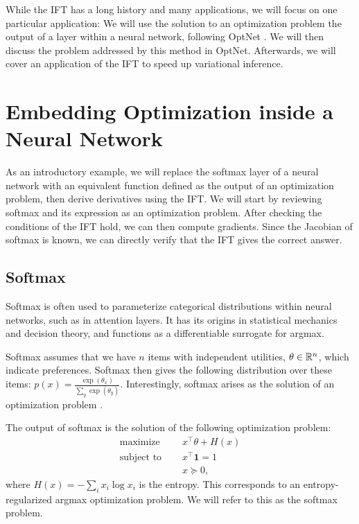 \documentclass[11pt]{article}
\begin{document}
While the IFT has a long history and many applications, we will focus on one particular application:
We will use the solution to an optimization problem the output of a layer within a neural network,
following OptNet \citep{optnet}.
We will then discuss the problem addressed by this method in OptNet.
Afterwards, we will cover an application of the IFT to speed up variational inference.

\section{Embedding Optimization inside a Neural Network}
As an introductory example,
we will replace the softmax layer of a neural network with an equivalent function
defined as the output of an optimization problem, then derive derivatives using the IFT.
We will start by reviewing softmax and its expression as an optimization problem.
After checking the conditions of the IFT hold, we can then compute gradients.
Since the Jacobian of softmax is known, we can directly verify that the IFT gives
the correct answer.


\subsection{Softmax}
Softmax is often used to parameterize categorical distributions within neural networks,
such as in attention layers.
It has its origins in statistical mechanics and decision theory, and functions
as a differentiable surrogate for argmax.

Softmax assumes that we have $n$ items with independent utilities, $\theta \in \mathbb{R}^n$,
which indicate preferences.
Softmax then gives the following distribution over these items:
$p(x) = \frac{\exp(\theta_x)}{\sum_y \exp(\theta_y)}$.
Interestingly, softmax arises as the solution of an optimization problem
\citep{gao2018properties}.

The output of softmax is the solution of the following optimization problem:
\begin{equation}
\label{eqn:softmax-opt}
\begin{aligned}
\textrm{maximize } \quad & x^\top\theta + H(x)\\
\textrm{subject to } \quad & x^\top \mathbf{1} = 1\\
& x \succeq 0,
\end{aligned}
\end{equation}
where $H(x) = -\sum_i x_i \log x_i$ is the entropy.
This corresponds to an entropy-regularized argmax optimization problem.
We will refer to this as the softmax problem.
\end{document}
